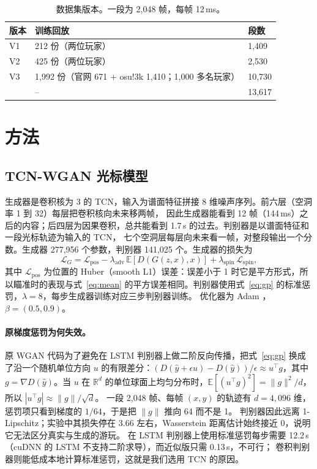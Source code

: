 \documentclass[11pt,a4paper,fontset=windows]{ctexart}
\newcommand{\E}{\mathbb{E}}
\begin{document}
\begin{table}[t]
\centering
\caption{数据集版本。一段为 2{,}048 帧，每帧 12\,ms。}
\label{tab:data}
\begin{tabular}{lll}
\toprule
版本 & 训练回放 & 段数 \\
\midrule
V1 & 212 份（两位玩家） & 1{,}409 \\
V2 & 425 份（两位玩家） & 2{,}530 \\
V3 & 1{,}992 份（官网 671 + osu!3k 1{,}410；1{,}000 多名玩家） & 10{,}730 \\
\midrule
\citet{niooii} & -- & 13{,}617 \\
\bottomrule
\end{tabular}
\end{table}

\section{方法}
\subsection{TCN-WGAN 光标模型}
生成器是卷积核为 3 的 TCN，输入为谱面特征拼接 8 维噪声序列。前六层（空洞率 1 到 32）每层把卷积核向未来移两帧，
因此生成器能看到 12 帧（144\,ms）之后的内容；后四层为因果卷积，总共能看到 1.7\,s 的过去。判别器是以谱面特征和一段光标轨迹为输入的 TCN，
七个空洞层每层向未来看一帧，对整段输出一个分数。生成器 277{,}956 个参数，判别器 141{,}025 个。生成器的损失为
\begin{equation}
  \mathcal{L}_G = \mathcal{L}_{\mathrm{pos}} - \lambda_{\mathrm{adv}}\,\E[D(G(z,x),x)] + \lambda_{\mathrm{spin}}\,\mathcal{L}_{\mathrm{spin}},
\end{equation}
其中 $\mathcal{L}_{\mathrm{pos}}$ 为位置的 Huber（smooth L1）误差：误差小于 1 时它是平方形式，所以瞄准时的表现与式~\eqref{eq:mean} 的平方误差相同。判别器使用式~\eqref{eq:gp} 的标准惩罚，$\lambda=8$，每步生成器训练对应三步判别器训练。
优化器为 Adam \citep{kingma2015}，$\beta=(0.5,0.9)$。

\paragraph{原梯度惩罚为何失效。} 原 WGAN 代码为了避免在 LSTM 判别器上做二阶反向传播，把式~\eqref{eq:gp} 换成了沿一个随机单位方向 $u$
的有限差分：$(D(\hat y+\epsilon u)-D(\hat y))/\epsilon \approx u^\top g$，其中 $g=\nabla D(\hat y)$。当 $u$ 在 $\mathbb{R}^d$
的单位球面上均匀分布时，$\E[(u^\top g)^2]=\lVert g\rVert^2/d$，所以 $|u^\top g|\approx\lVert g\rVert/\sqrt d$。
一段 2{,}048 帧、每帧 $(x,y)$ 的轨迹有 $d=4{,}096$ 维，惩罚项只看到梯度的 $1/64$，于是把 $\lVert g\rVert$ 推向 64 而不是 1。
判别器因此远离 1-Lipschitz；实验中其损失停在 3.66 左右，Wasserstein 距离估计始终接近 0，说明它无法区分真实与生成的游玩。
在 LSTM 判别器上使用标准惩罚每步需要 12.2\,s（cuDNN 的 LSTM 不支持二阶求导），而近似版只需 0.13\,s，不可行；
卷积判别器则能低成本地计算标准惩罚，这就是我们选用 TCN 的原因。
\end{document}

